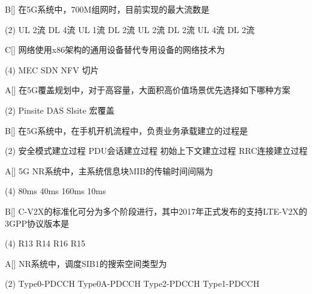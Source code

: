 \begin{choice}{B}[]
    在5G系统中，700M组网时，目前实现的最大流数是
    \begin{tasks}(2)
        \task UL 2流 DL 4流
        \task UL 1流 DL 2流
        \task UL 2流 DL 2流
        \task UL 4流 DL 2流
    \end{tasks}
\end{choice}


\begin{choice}{C}[]
    网络使用x86架构的通用设备替代专用设备的网络技术为
    \begin{tasks}(4)
        \task MEC
        \task SDN
        \task NFV
        \task 切片
    \end{tasks}
\end{choice}


\begin{choice}{A}[]
    在5G覆盖规划中，对于高容量，大面积高价值场景优先选择如下哪种方案
    \begin{tasks}(2)
        \task Pinsite
        \task DAS
        \task Slsite
        \task 宏覆盖
    \end{tasks}
\end{choice}

\begin{choice}{B}[]
    在5G系统中，在手机开机流程中，负责业务承载建立的过程是
    \begin{tasks}(2)
        \task 安全模式建立过程
        \task PDU会话建立过程
        \task 初始上下文建立过程
        \task RRC连接建立过程
    \end{tasks}
\end{choice}

\begin{choice}{A}[]
    5G NR系统中，主系统信息块MIB的传输时间间隔为
    \begin{tasks}(4)
        \task 80ms
        \task 40ms
        \task 160ms
        \task 10ms
    \end{tasks}
\end{choice}



\begin{choice}{B}[]
    C-V2X的标准化可分为多个阶段进行，其中2017年正式发布的支持LTE-V2X的3GPP协议版本是
    \begin{tasks}(4)
        \task R13
        \task R14
        \task R16
        \task R15
    \end{tasks}
\end{choice}

\begin{choice}{A}[]
    NR系统中，调度SIB1的搜索空间类型为
    \begin{tasks}(2)
        \task Type0-PDCCH
        \task Type0A-PDCCH
        \task Type2-PDCCH
        \task Type1-PDCCH
    \end{tasks}
\end{choice}


